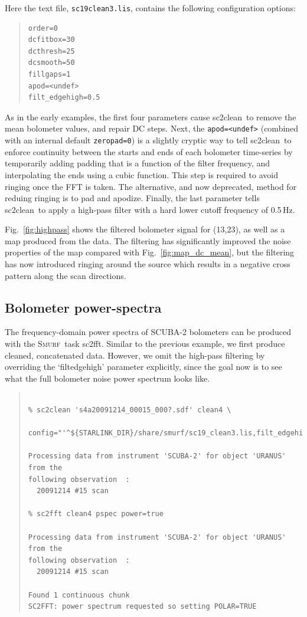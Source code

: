 \documentclass[twoside,11pt]{article}
\newcommand{\xref}[3]{#1}
\newcommand{\xlabel}[1]{}
\renewcommand{\_}{\texttt{\symbol{95}}}
\newenvironment{myquote}{\begin{quote}\begin{small}}{\end{small}\end{quote}}
\newcommand{\smurf}{\xref{\textsc{Smurf}}{sun258}{}}
\newcommand{\task}[1]{\textsf{#1}}
\newcommand{\fft}{\xref{\task{sc2fft}}{sun258}{SC2FFT}}
\newcommand{\clean}{\xref{\task{sc2clean}}{sun258}{SC2CLEAN}}
\begin{document}
Here the text file, \texttt{sc19\_clean3.lis}, contains the following
configuration options:

\begin{myquote}
\begin{verbatim}
order=0
dcfitbox=30
dcthresh=25
dcsmooth=50
fillgaps=1
apod=<undef>
filt_edgehigh=0.5
\end{verbatim}
\end{myquote}

As in the early examples, the first four parameters cause \clean\ to
remove the mean bolometer values, and repair DC steps. Next, the
\texttt{apod=<undef>} (combined with an internal default
\texttt{zeropad=0}) is a slightly cryptic way to tell \clean\ to
enforce continuity between the starts and ends of each bolometer
time-series by temporarily adding padding that is a function of the
filter frequency, and interpolating the ends using a cubic
function. This step is required to avoid ringing once the FFT is
taken. The alternative, and now deprecated, method for reduing ringing
is to pad and apodize. Finally, the last parameter tells \clean\ to
apply a high-pass filter with a hard lower cutoff frequency of
0.5\,Hz.

Fig.~\ref{fig:highpass} shows the filtered bolometer signal for
(13,23), as well as a map produced from the data. The filtering has
significantly improved the noise properties of the map compared with
Fig.~\ref{fig:map_dc_mean}, but the filtering has now introduced
ringing around the source which results in a negative cross pattern
along the scan directions.

\subsection{\xlabel{pspec}Bolometer power-spectra}

The frequency-domain power spectra of SCUBA-2 bolometers can be
produced with the \smurf\ task \fft. Similar to the previous example,
we first produce cleaned, concatenated data. However, we omit the
high-pass filtering by overriding the `filt\_edgehigh' parameter
explicitly, since the goal now is to see what the full bolometer noise
power spectrum looks like.

\begin{myquote}
\begin{verbatim}

% sc2clean 's4a20091214_00015_000?.sdf' clean4 \
   config="'^${STARLINK_DIR}/share/smurf/sc19_clean3.lis,filt_edgehigh=0'"

Processing data from instrument 'SCUBA-2' for object 'URANUS' from the
following observation  :
  20091214 #15 scan

% sc2fft clean4 pspec power=true

Processing data from instrument 'SCUBA-2' for object 'URANUS' from the
following observation  :
  20091214 #15 scan

Found 1 continuous chunk
SC2FFT: power spectrum requested so setting POLAR=TRUE

\end{verbatim}
\end{myquote}
\end{document}
